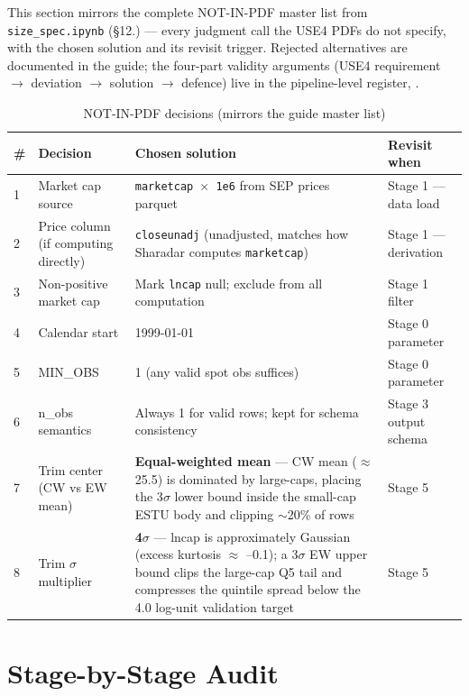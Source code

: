 \documentclass[11pt,a4paper]{article}
\begin{document}
This section mirrors the complete NOT-IN-PDF master list from
\texttt{size\_spec.ipynb} (\S12.) --- every judgment call the USE4 PDFs do not
specify, with the chosen solution and its revisit trigger. Rejected alternatives
are documented in the guide; the four-part validity arguments (USE4 requirement
$\to$ deviation $\to$ solution $\to$ defence) live in the pipeline-level
register, .

\begin{longtable}{@{}p{0.5cm}p{3.6cm}p{6.0cm}p{3.8cm}@{}}
\caption{NOT-IN-PDF decisions (mirrors the guide master list)}\\
\toprule
\textbf{\#} & \textbf{Decision} & \textbf{Chosen solution} & \textbf{Revisit when} \\
\midrule
\endhead
1 & Market cap source & \texttt{marketcap $\times$ 1e6} from SEP prices parquet & Stage 1 --- data load \\[3pt]
2 & Price column (if computing directly) & \texttt{closeunadj} (unadjusted, matches how Sharadar computes \texttt{marketcap}) & Stage 1 --- derivation \\[3pt]
3 & Non-positive market cap & Mark \texttt{lncap} null; exclude from all computation & Stage 1 filter \\[3pt]
4 & Calendar start & 1999-01-01 & Stage 0 parameter \\[3pt]
5 & MIN\_OBS & 1 (any valid spot obs suffices) & Stage 0 parameter \\[3pt]
6 & n\_obs semantics & Always 1 for valid rows; kept for schema consistency & Stage 3 output schema \\[3pt]
7 & Trim center (CW vs EW mean) & \textbf{Equal-weighted mean} --- CW mean ($\approx$ 25.5) is dominated by large-caps, placing the 3$\sigma$ lower bound inside the small-cap ESTU body and clipping $\sim$20\% of rows & Stage 5 \\[3pt]
8 & Trim $\sigma$ multiplier & \textbf{4$\sigma$} --- lncap is approximately Gaussian (excess kurtosis $\approx$ --0.1); a 3$\sigma$ EW upper bound clips the large-cap Q5 tail and compresses the quintile spread below the 4.0 log-unit validation target & Stage 5 \\[3pt]
\bottomrule
\end{longtable}

\section{Stage-by-Stage Audit}
\end{document}
